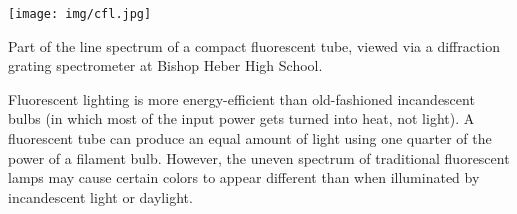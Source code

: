 \begin{marginfigure}
\texttt{[image: img/cfl.jpg]}
\caption{Part of the line spectrum of a compact fluorescent tube, viewed via a diffraction grating spectrometer at Bishop Heber High School.}
\end{marginfigure}

Fluorescent lighting is more energy-efficient than old-fashioned incandescent bulbs (in which most of the input power gets turned into heat, not light).  A fluorescent tube can produce an equal amount of light using one quarter of the power of a filament bulb.  However, the uneven spectrum of traditional fluorescent lamps may cause certain colors to appear different than when illuminated by incandescent light or daylight.


